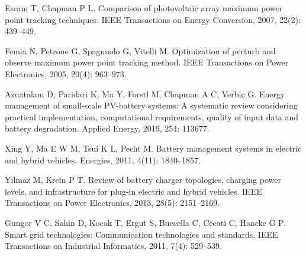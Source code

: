 \begin{enumerate}[label={[\arabic*]}, leftmargin=*, itemsep=0.6ex]
  \item Esram T, Chapman P L. Comparison of photovoltaic array maximum power point tracking techniques. IEEE Transactions on Energy Conversion, 2007, 22(2): 439--449.
  \item Femia N, Petrone G, Spagnuolo G, Vitelli M. Optimization of perturb and observe maximum power point tracking method. IEEE Transactions on Power Electronics, 2005, 20(4): 963--973.
  \item Azuatalam D, Paridari K, Ma Y, Forstl M, Chapman A C, Verbic G. Energy management of small-scale PV-battery systems: A systematic review considering practical implementation, computational requirements, quality of input data and battery degradation. Applied Energy, 2019, 254: 113677.
  \item Xing Y, Ma E W M, Tsui K L, Pecht M. Battery management systems in electric and hybrid vehicles. Energies, 2011, 4(11): 1840--1857.
  \item Yilmaz M, Krein P T. Review of battery charger topologies, charging power levels, and infrastructure for plug-in electric and hybrid vehicles. IEEE Transactions on Power Electronics, 2013, 28(5): 2151--2169.
  \item Gungor V C, Sahin D, Kocak T, Ergut S, Buccella C, Cecati C, Hancke G P. Smart grid technologies: Communication technologies and standards. IEEE Transactions on Industrial Informatics, 2011, 7(4): 529--539.
\end{enumerate}

